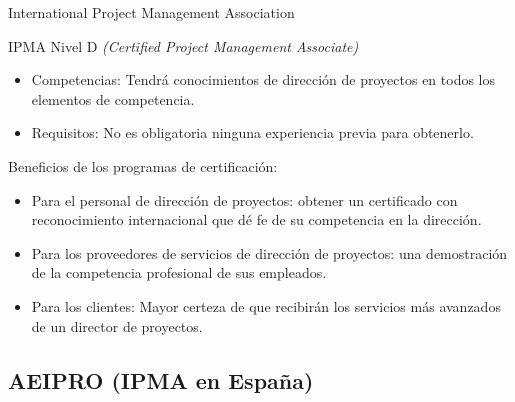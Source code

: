 \begin{frame}[allowframebreaks]{International Project Management Association}
	\begin{block}{IPMA Nivel D \emph{(Certified Project Management Associate)}}
		\begin{itemize}
			\item Competencias: Tendrá conocimientos de dirección de proyectos en todos los elementos de competencia.
			\item Requisitos: No es obligatoria ninguna experiencia previa para obtenerlo.
		\end{itemize}
	\end{block}
	
	\framebreak
	
	Beneficios de los programas de certificación:
	
	\begin{itemize}
		\item Para el personal de dirección de proyectos: obtener un certificado con reconocimiento internacional que dé fe de su competencia en la dirección.
		\item Para los proveedores de servicios de dirección de proyectos: una demostración de la competencia profesional de sus empleados.
		\item Para los clientes: Mayor certeza de que recibirán los servicios más avanzados de un director de proyectos.
	\end{itemize}
\end{frame}

\subsection{AEIPRO (IPMA en España)}

